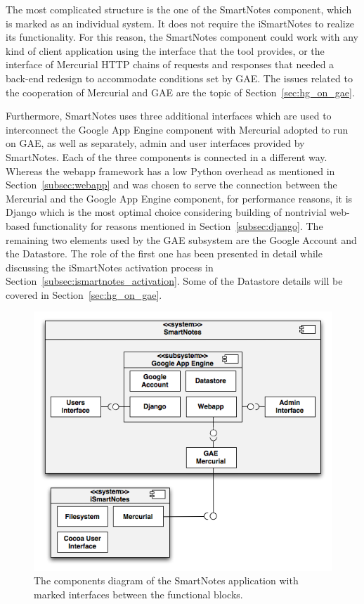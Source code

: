 The most complicated structure is the one of the SmartNotes component, which is marked as an individual system. It does not require the iSmartNotes to realize its functionality. For this reason, the SmartNotes component could work with any kind of client application using the interface that the tool provides, or the interface of Mercurial HTTP chains of requests and responses that needed a back-end redesign to accommodate conditions set by GAE. The issues related to the cooperation of Mercurial and GAE are the topic of Section~\ref{sec:hg_on_gae}.
 
Furthermore, SmartNotes uses three additional interfaces which are used to interconnect the Google App Engine component with Mercurial adopted to run on GAE, as well as separately, admin and user interfaces provided by SmartNotes. Each of the three components is connected in a different way. Whereas the webapp framework has a low Python overhead as mentioned in Section~\ref{subsec:webapp} and was chosen to serve the connection between the Mercurial and the Google App Engine component, for performance reasons, it is Django which is the most optimal choice considering building of nontrivial web-based functionality for reasons mentioned in Section~\ref{subsec:django}. The remaining two elements used by the GAE subsystem are the Google Account and the Datastore. The role of the first one has been presented in detail while discussing the iSmartNotes activation process in Section~\ref{subsec:ismartnotes_activation}. Some of the Datastore details will be covered in Section~\ref{sec:hg_on_gae}.
\begin{figure}[ht]
\begin{center}
\includegraphics[scale=0.6]{charts/smartnotes_componets.png}
\caption{The components diagram of the SmartNotes application with marked interfaces between the functional blocks.}
\label{fig:smartnotes_components}
\end{center}
\end{figure}
 
